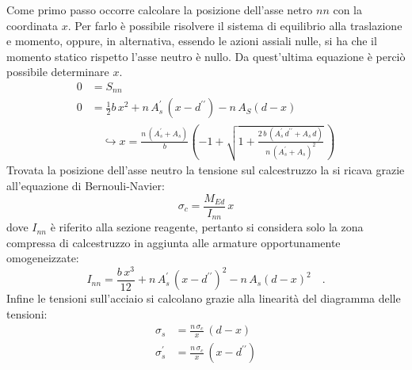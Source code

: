Come primo passo occorre calcolare la posizione dell'asse netro $nn$ con la coordinata $x$. 
Per farlo è possibile risolvere il sistema di equilibrio alla traslazione e momento, oppure, in alternativa, essendo le azioni assiali nulle, si ha che il momento statico rispetto l'asse neutro è nullo. 
Da quest'ultima equazione è perciò possibile determinare $x$.
\begin{align}
    0 &= S_{nn}  \\
    0 &= \frac{1}{2} b\,x^2 + n\,A_s^\prime\,(x - d^{\prime\prime}) - n\,A_S(d-x) \\
    &\quad\hookrightarrow x = \frac{n\,(A_s^\prime + A_s)}{b} \left( -1 + \sqrt{1 + \frac{2\,b\,(A_s^\prime \, d^{\prime\prime} + A_s\,d)}{n\,(A_s^\prime + A_s)^2}} \, \right)
\end{align}
Trovata la posizione dell'asse neutro la tensione sul calcestruzzo la si ricava grazie all'equazione di Bernouli-Navier:
\begin{equation}
    \sigma_c = \frac{M_{Ed}}{I_{nn}} \, x
\end{equation}
dove $I_{nn}$ è riferito alla sezione reagente, pertanto si considera solo la zona compressa di calcestruzzo in aggiunta alle armature opportunamente omogeneizzate:
\begin{equation}
    I_{nn} = \frac{b\, x^3}{12} + n\,A_s^\prime\,(x - d^{\prime\prime})^2 - n\,A_s(d-x)^2 \quad.
\end{equation}
Infine le tensioni sull'acciaio si calcolano grazie alla linearità del diagramma delle tensioni:
\begin{align}
    \sigma_s &= \frac{n\,\sigma_c}{x} \, (d-x) \\
    \sigma_s^\prime &= \frac{n\,\sigma_c}{x} \,(x - d^{\prime\prime})
\end{align}

